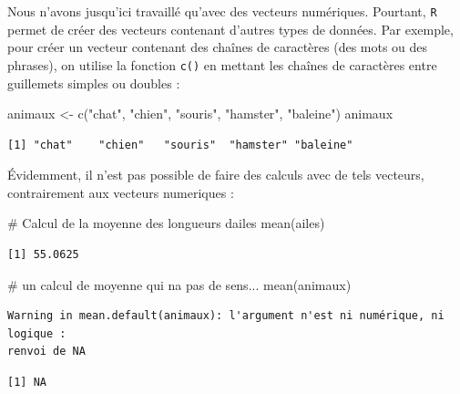 \documentclass[
  a4paper,
  DIV=11,
  numbers=noendperiod,
  oneside]{scrreprt}
\newenvironment{Shaded}{}{}
\newcommand{\CommentTok}[1]{\textcolor[rgb]{0.42,0.45,0.49}{#1}}
\newcommand{\FunctionTok}[1]{\textcolor[rgb]{0.44,0.26,0.76}{#1}}
\newcommand{\NormalTok}[1]{\textcolor[rgb]{0.14,0.16,0.18}{#1}}
\newcommand{\OtherTok}[1]{\textcolor[rgb]{0.44,0.26,0.76}{#1}}
\newcommand{\StringTok}[1]{\textcolor[rgb]{0.01,0.18,0.38}{#1}}
\begin{document}
Nous n'avons jusqu'ici travaillé qu'avec des vecteurs numériques.
Pourtant, \texttt{R} permet de créer des vecteurs contenant d'autres
types de données. Par exemple, pour créer un vecteur contenant des
chaînes de caractères (des mots ou des phrases), on utilise la fonction
\texttt{c()} en mettant les chaînes de caractères entre guillemets
simples ou doubles :

\begin{Shaded}
\begin{Highlighting}[]
\NormalTok{animaux }\OtherTok{\textless{}{-}} \FunctionTok{c}\NormalTok{(}\StringTok{"chat"}\NormalTok{, }\StringTok{"chien"}\NormalTok{, }\StringTok{"souris"}\NormalTok{, }\StringTok{"hamster"}\NormalTok{, }\StringTok{"baleine"}\NormalTok{)}
\NormalTok{animaux}
\end{Highlighting}
\end{Shaded}

\begin{verbatim}
[1] "chat"    "chien"   "souris"  "hamster" "baleine"
\end{verbatim}

Évidemment, il n'est pas possible de faire des calculs avec de tels
vecteurs, contrairement aux vecteurs numeriques :

\begin{Shaded}
\begin{Highlighting}[]
\CommentTok{\# Calcul de la moyenne des longueurs d\textquotesingle{}ailes}
\FunctionTok{mean}\NormalTok{(ailes)}
\end{Highlighting}
\end{Shaded}

\begin{verbatim}
[1] 55.0625
\end{verbatim}

\begin{Shaded}
\begin{Highlighting}[]
\CommentTok{\# un calcul de moyenne qui n\textquotesingle{}a pas de sens...}
\FunctionTok{mean}\NormalTok{(animaux)}
\end{Highlighting}
\end{Shaded}

\begin{verbatim}
Warning in mean.default(animaux): l'argument n'est ni numérique, ni logique :
renvoi de NA
\end{verbatim}

\begin{verbatim}
[1] NA
\end{verbatim}
\end{document}
